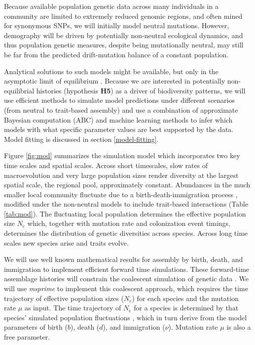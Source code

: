 \documentclass[11pt]{article}
\begin{document}
Because available population genetic data across many individuals in a
community are limited to extremely reduced genomic regions, and often
mined for synonymous SNPs, we will initially model neutral mutations.
However, demography will be driven by potentially non-neutral
ecological dynamics, and thus population genetic measures, despite
being mutationally neutral, may still be far from the predicted
drift-mutation balance of a constant population.

Analytical solutions to such models might be available, but only in
the asymptotic limit of equilibrium \citep[e.g.,][]{Etienne2007-we,
  Rosindell2015-gp}. Because we are interested in potentially
non-equilibrial histories (hypothesis \textbf{H5}) as a driver of
biodiversity patterns, we will use efficient methods to simulate model
predictions under different scenarios (from neutral to trait-based
assembly) and use a combination of approximate Bayesian computation
(ABC) and machine learning methods to infer which models with what
specific parameter values are best supported by the data. Model
fitting is discussed in section \ref{model-fitting}.

Figure \ref{fig:mod} summarizes the simulation model which
incorporates two key time scales and spatial scales. Across short
timescales, slow rates of macroevolution and very large population
sizes render diversity at the largest spatial scale, the regional
pool, approximately constant. Abundances in the much smaller local
community fluctuate due to a birth-death-immigration process
\cite{Kendall1948-ri}, modified under the non-neutral models to
include trait-based interactions (Table \ref{tab:mod}).  The
fluctuating local population determines the effective population size
$N_e$ which, together with mutation rate and colonization event
timings, determines the distribution of genetic diversities across
species. Across long time scales new species arise and traits evolve.

We will use well known mathematical results for assembly by birth,
death, and immigration \cite{Haegeman2017-kf,Kendall1948-ri} to
implement efficient forward time simulations.  These forward-time
assemblage histories will constrain the coalescent simulation of
genetic data \cite{Rosenberg2002-vb, waples2007}. We will use {\it
  msprime} \cite{Kelleher2016-an} to implement this coalescent
approach, which requires the time trajectory of effective population
sizes ($N_e$) for each species and the mutation rate $\mu$ as
input. The time trajectory of $N_e$ for a species is determined by
that species' simulated population fluctuations \cite{waples2007},
which in turn derive from the model parameters of birth ($b$), death
($d$), and immigration ($\nu$).  Mutation rate $\mu$ is also a free
parameter.
\end{document}
